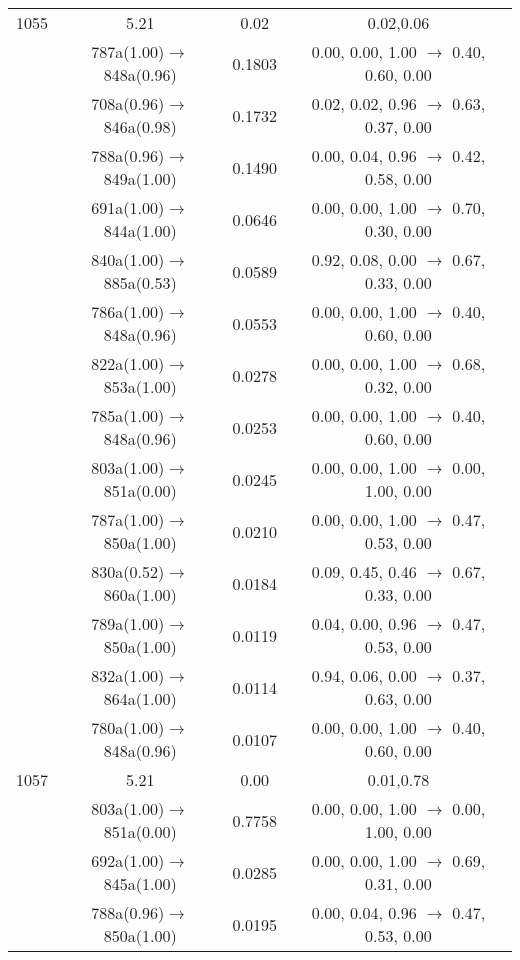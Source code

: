 \documentclass[10pt,a4paper]{article}
\begin{document}
\begin{longtable}{c|c|c|c}
 \hline1055 &	 5.21 &	 0.02 &	 0.02,0.06 \\ 
  	& 787a(1.00)$\rightarrow$848a(0.96) &	 0.1803 &	 0.00, 0.00, 1.00 $\rightarrow$ 0.40, 0.60, 0.00 \\ 
 	& 708a(0.96)$\rightarrow$846a(0.98) &	 0.1732 &	 0.02, 0.02, 0.96 $\rightarrow$ 0.63, 0.37, 0.00 \\ 
 	& 788a(0.96)$\rightarrow$849a(1.00) &	 0.1490 &	 0.00, 0.04, 0.96 $\rightarrow$ 0.42, 0.58, 0.00 \\ 
 	& 691a(1.00)$\rightarrow$844a(1.00) &	 0.0646 &	 0.00, 0.00, 1.00 $\rightarrow$ 0.70, 0.30, 0.00 \\ 
 	& 840a(1.00)$\rightarrow$885a(0.53) &	 0.0589 &	 0.92, 0.08, 0.00 $\rightarrow$ 0.67, 0.33, 0.00 \\ 
 	& 786a(1.00)$\rightarrow$848a(0.96) &	 0.0553 &	 0.00, 0.00, 1.00 $\rightarrow$ 0.40, 0.60, 0.00 \\ 
 	& 822a(1.00)$\rightarrow$853a(1.00) &	 0.0278 &	 0.00, 0.00, 1.00 $\rightarrow$ 0.68, 0.32, 0.00 \\ 
 	& 785a(1.00)$\rightarrow$848a(0.96) &	 0.0253 &	 0.00, 0.00, 1.00 $\rightarrow$ 0.40, 0.60, 0.00 \\ 
 	& 803a(1.00)$\rightarrow$851a(0.00) &	 0.0245 &	 0.00, 0.00, 1.00 $\rightarrow$ 0.00, 1.00, 0.00 \\ 
 	& 787a(1.00)$\rightarrow$850a(1.00) &	 0.0210 &	 0.00, 0.00, 1.00 $\rightarrow$ 0.47, 0.53, 0.00 \\ 
 	& 830a(0.52)$\rightarrow$860a(1.00) &	 0.0184 &	 0.09, 0.45, 0.46 $\rightarrow$ 0.67, 0.33, 0.00 \\ 
 	& 789a(1.00)$\rightarrow$850a(1.00) &	 0.0119 &	 0.04, 0.00, 0.96 $\rightarrow$ 0.47, 0.53, 0.00 \\ 
 	& 832a(1.00)$\rightarrow$864a(1.00) &	 0.0114 &	 0.94, 0.06, 0.00 $\rightarrow$ 0.37, 0.63, 0.00 \\ 
 	& 780a(1.00)$\rightarrow$848a(0.96) &	 0.0107 &	 0.00, 0.00, 1.00 $\rightarrow$ 0.40, 0.60, 0.00 \\ 
 \hline1057 &	 5.21 &	 0.00 &	 0.01,0.78 \\ 
  	& 803a(1.00)$\rightarrow$851a(0.00) &	 0.7758 &	 0.00, 0.00, 1.00 $\rightarrow$ 0.00, 1.00, 0.00 \\ 
 	& 692a(1.00)$\rightarrow$845a(1.00) &	 0.0285 &	 0.00, 0.00, 1.00 $\rightarrow$ 0.69, 0.31, 0.00 \\ 
 	& 788a(0.96)$\rightarrow$850a(1.00) &	 0.0195 &	 0.00, 0.04, 0.96 $\rightarrow$ 0.47, 0.53, 0.00 \\ 

\end{longtable}
\end{document}
